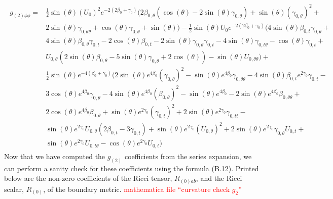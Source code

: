 \documentclass[a4paper,11pt]{article}
\numberwithin{equation}{section}
\begin{document}
\begin{subequations}
\begin{align}
\begin{split} \label{eq: g_2phiphi}
g_{(2) \phi \phi}=&\frac{1}{2} \sin (\theta ) (U_{0})^2  e^{-2 (2 \beta_{0}+\gamma_{0})} (2 \beta_{0, \theta} (\cos (\theta )-2 \sin (\theta ) \gamma_{0, \theta})+\sin (\theta ) (\gamma_{0, \theta})^2+\\
&2 \sin (\theta ) \gamma_{0, \theta \theta}+\cos (\theta ) \gamma_{0, \theta}+\sin (\theta ))-\frac{1}{2} \sin (\theta ) U_{0}  e^{-2 (2 \beta_{0}+\gamma_{0})} (4 \sin (\theta ) \beta_{0, t} \gamma_{0, \theta}+\\
&4 \sin (\theta ) \beta_{0, \theta} \gamma_{0, t}-2 \cos (\theta ) \beta_{0, t}-2 \sin (\theta ) \gamma_{0, \theta} \gamma_{0, t}-4 \sin (\theta ) \gamma_{0, t \theta}-\cos (\theta ) \gamma_{0, t}+\\
&U_{0, \theta} (2 \sin (\theta ) \beta_{0, \theta}-5 \sin (\theta ) \gamma_{0, \theta}+2 \cos (\theta ))-\sin (\theta ) U_{0, \theta \theta})+\\
&\frac{1}{2} \sin (\theta ) e^{-4 (\beta_{0}+\gamma_{0})} (2 \sin (\theta ) e^{4 \beta_{0}} (\gamma_{0, \theta})^2-\sin (\theta ) e^{4 \beta_{0}} \gamma_{0, \theta \theta}-4 \sin (\theta ) \beta_{0, t} e^{2 \gamma_{0}} \gamma_{0, t}-\\
&3 \cos (\theta ) e^{4 \beta_{0}} \gamma_{0, \theta}-4 \sin (\theta ) e^{4 \beta_{0}} (\beta_{0, \theta})^2-\sin (\theta ) e^{4 \beta_{0}}-2 \sin (\theta ) e^{4 \beta_{0}} \beta_{0, \theta \theta}+\\
&2 \cos (\theta ) e^{4 \beta_{0}} \beta_{0, \theta}+\sin (\theta ) e^{2 \gamma_{0}} (\gamma_{0, t})^2+2 \sin (\theta ) e^{2 \gamma_{0}} \gamma_{0, t t}-\\
&\sin (\theta ) e^{2 \gamma_{0}} U_{0, \theta} (2 \beta_{0, t}-3 \gamma_{0, t})+\sin (\theta ) e^{2 \gamma_{0}} (U_{0, \theta})^2+2 \sin (\theta ) e^{2 \gamma_{0}} \gamma_{0, \theta} U_{0, t}+\\
&\sin (\theta ) e^{2 \gamma_{0}} U_{0, t \theta}-\cos (\theta ) e^{2 \gamma_{0}} U_{0, t})
\end{split}
\end{align}

\end{subequations}
Now that we have computed the $g_{(2)}$ coefficients from the series expansion, we can perform a sanity check for these coefficients using the formula (B.12). Printed below are the non-zero  coefficients of the Ricci tensor,  $R_{(0) ab}$, and the Ricci scalar, $R_{(0)}$, of the boundary metric. \textcolor{red}{mathematica file ``curvature check $g_2$''}  \\ 
\end{document}
